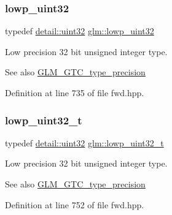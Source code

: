 \subsubsection{\texorpdfstring{lowp\+\_\+uint32}{lowp\_uint32}}
{\footnotesize\ttfamily typedef \hyperlink{namespaceglm_1_1detail_ade6cfbf377022aaa391af8cd50489222}{detail\+::uint32} \hyperlink{group__gtc__type__precision_gaf11e85af414720b4cd12bd57b3a81e68}{glm\+::lowp\+\_\+uint32}}

Low precision 32 bit unsigned integer type. \begin{DoxySeeAlso}{See also}
\hyperlink{group__gtc__type__precision}{G\+L\+M\+\_\+\+G\+T\+C\+\_\+type\+\_\+precision} 
\end{DoxySeeAlso}


Definition at line 735 of file fwd.\+hpp.

\mbox{\label{group__gtc__type__precision_ga9f8cb602a358e1f48bda2682cf051f0c}} 
\subsubsection{\texorpdfstring{lowp\+\_\+uint32\+\_\+t}{lowp\_uint32\_t}}
{\footnotesize\ttfamily typedef \hyperlink{namespaceglm_1_1detail_ade6cfbf377022aaa391af8cd50489222}{detail\+::uint32} \hyperlink{group__gtc__type__precision_ga9f8cb602a358e1f48bda2682cf051f0c}{glm\+::lowp\+\_\+uint32\+\_\+t}}

Low precision 32 bit unsigned integer type. \begin{DoxySeeAlso}{See also}
\hyperlink{group__gtc__type__precision}{G\+L\+M\+\_\+\+G\+T\+C\+\_\+type\+\_\+precision} 
\end{DoxySeeAlso}


Definition at line 752 of file fwd.\+hpp.

\mbox{\label{group__gtc__type__precision_gacf666a9d9b309c4615c7a4f2ab0be289}} 
